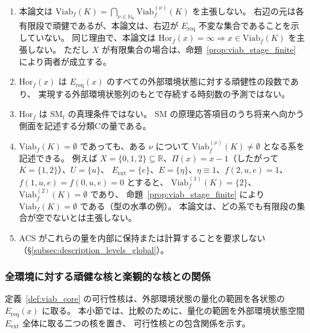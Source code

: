 \begin{remark}[頑健存続可能段数の地位と限定]
\label{rem:viab_stage_scope}
\begin{enumerate}
  \item 本論文は $\mathrm{Viab}_f(K)=\bigcap_{\nu\in\mathbb{N}_0}\mathrm{Viab}_f^{(\nu)}(K)$ を主張しない。
  右辺の元は各有限段で頑健であるが、本論文は、右辺が $E_{\mathrm{req}}$ 不変な集合であることを示していない。
  同じ理由で、本論文は $\mathrm{Hor}_f(x)=\infty\Rightarrow x\in\mathrm{Viab}_f(K)$ を主張しない。
  ただし $X$ が有限集合の場合は、命題~\ref{prop:viab_stage_finite} により両者が成立する。
  \item $\mathrm{Hor}_f(x)$ は $E_{\mathrm{req}}(x)$ のすべての外部環境状態に対する頑健性の段数であり、
  実現する外部環境状態列のもとで存続する時刻数の予測ではない。
  \item $\mathrm{Hor}_f$ は $\mathrm{SM}_t$ の真理条件ではない。
  SM の原理応答項目のうち将来へ向かう側面を記述する分類Cの量である。
  \item $\mathrm{Viab}_f(K)=\emptyset$ であっても、ある $\nu$ について
  $\mathrm{Viab}_f^{(\nu)}(K)\neq\emptyset$ となる系を記述できる。
  例えば $X=\{0,1,2\}\subseteq\mathbb R$、$\Pi(x)=x-1$（したがって $K=\{1,2\}$）、$U=\{u\}$、
  $E_{\mathrm{ext}}=\{e\}$、$E=\{\eta\}$、$\eta\equiv1$、$f(2,u,e)=1$、$f(1,u,e)=f(0,u,e)=0$ とすると、
  $\mathrm{Viab}_f^{(1)}(K)=\{2\}$、$\mathrm{Viab}_f^{(2)}(K)=\emptyset$ であり、
  命題~\ref{prop:viab_stage_finite} により $\mathrm{Viab}_f(K)=\emptyset$ である（型の水準の例）。
  本論文は、どの系でも有限段の集合が空でないとは主張しない。
  \item ACS がこれらの量を内部に保持または計算することを要求しない
  （\S\ref{subsec:description_levels_global}）。
\end{enumerate}
\end{remark}

\subsubsection{全環境に対する頑健な核と楽観的な核との関係}

定義~\ref{def:viab_core} の可行性核は、外部環境状態の量化の範囲を各状態の $E_{\mathrm{req}}(x)$ に取る。
本小節では、比較のために、量化の範囲を外部環境状態空間 $E_{\mathrm{ext}}$ 全体に取る二つの核を置き、
可行性核との包含関係を示す。

